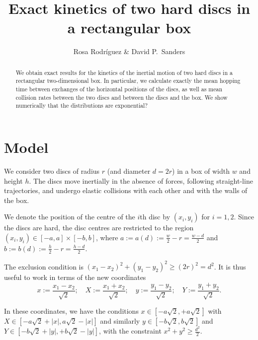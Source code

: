 \documentclass[a4paper,10pt]{article}
\title{Exact kinetics of two hard discs in a rectangular box}
\author{Rosa Rodríguez \& David P.~Sanders}
\newcommand{\defeq}{:=}
\begin{document}
\maketitle
% 
 \begin{abstract}
%
We obtain exact results for the kinetics of the inertial motion of two hard discs in a rectangular two-dimensional box.
In particular, we calculate exactly the mean hopping time between exchanges of the horizontal positions of the discs, as well as mean collision rates between the two discs and between the discs and the box. We show numerically that the distributions are exponential?

 \end{abstract}

\section{Model}
We consider two discs of radius $r$ (and diameter $d=2r$) in a box of width $w$ and height $h$. The discs move inertially in the absence of forces, following straight-line trajectories, and undergo elastic collisions with each other and with the walls of the box.

We denote the position of the centre of the $i$th disc by $(x_{i}, y_{i})$ for $i=1,2$. Since the discs are hard, the disc centres are restricted to the region $(x_i, y_i) \in [-a,a] \times [-b, b]$, where $a \defeq a(d) \defeq \frac{w}{2} - r = \frac{w-d}{2}$ and $b \defeq b(d) \defeq \frac{h}{2} - r = \frac{h-d}{2}$.

The exclusion condition is $(x_1-x_2)^2 + (y_1-y_2)^2 \ge (2r)^2 = d^2$.
It is thus useful to work in terms of the new coordinates
\begin{equation}
 x \defeq \frac{x_1 - x_2}{\sqrt{2}}; 
\quad X \defeq \frac{x_1 + x_2}{\sqrt{2}}; 
\quad y \defeq \frac{y_1 - y_2}{\sqrt{2}}; 
\quad Y \defeq \frac{y_1 + y_2}{\sqrt{2}}.
\end{equation}


In these coordinates, we have the conditions $x \in [-a \sqrt{2}, +a \sqrt{2}]$ with $X \in [-a \sqrt{2} + |x|, a \sqrt{2} - |x|]$ and similarly $y \in [-b \sqrt{2}, b \sqrt{2}]$ and $Y \in [-b \sqrt{2} + |y|, +b \sqrt{2} - |y|]$,  with the constraint $x^2 + y^2 \ge \frac{d^2}{2}$.

%
\end{document}
